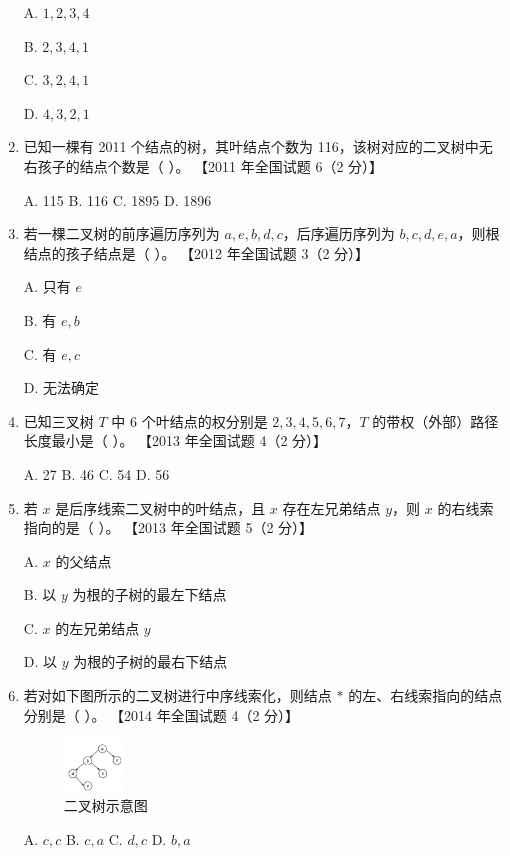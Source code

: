 \documentclass[lang=cn,newtx,10pt,scheme=chinese]{../../elegantbook}
\begin{document}
\begin{enumerate}
    A. $1, 2, 3, 4$  

    B. $2, 3, 4, 1$  

    C. $3, 2, 4, 1$  

    D. $4, 3, 2, 1$  

    \item 已知一棵有 2011 个结点的树，其叶结点个数为 116，该树对应的二叉树中无右孩子的结点个数是（ ）。  
    【2011 年全国试题 6（2 分）】  

    A. 115 \quad B. 116 \quad C. 1895 \quad D. 1896  

    \item 若一棵二叉树的前序遍历序列为 $a,e,b,d,c$，后序遍历序列为 $b,c,d,e,a$，则根结点的孩子结点是（ ）。  
    【2012 年全国试题 3（2 分）】 

    A. 只有 $e$  

    B. 有 $e, b$  

    C. 有 $e, c$  

    D. 无法确定  

    \item 已知三叉树 $T$ 中 6 个叶结点的权分别是 $2, 3, 4, 5, 6, 7$，$T$ 的带权（外部）路径长度最小是（ ）。  
    【2013 年全国试题 4（2 分）】 

    A. 27 \quad B. 46 \quad C. 54 \quad D. 56  

    \item 若 $x$ 是后序线索二叉树中的叶结点，且 $x$ 存在左兄弟结点 $y$，则 $x$ 的右线索指向的是（ ）。  
    【2013 年全国试题 5（2 分）】 

    A. $x$ 的父结点  

    B. 以 $y$ 为根的子树的最左下结点  

    C. $x$ 的左兄弟结点 $y$  

    D. 以 $y$ 为根的子树的最右下结点  

    \item 若对如下图所示的二叉树进行中序线索化，则结点 $*$ 的左、右线索指向的结点分别是（ ）。  
    【2014 年全国试题 4（2 分）】
    \begin{figure}[h!]
            \centering
            \includegraphics[width=0.15\textwidth]{../../figure/exercisePicPDF/chapter6/6-20.pdf}
            \caption{二叉树示意图}
    \end{figure}

    A. $c, c$ \quad B. $c, a$ \quad C. $d, c$ \quad D. $b, a$  


\end{enumerate}
\end{document}
